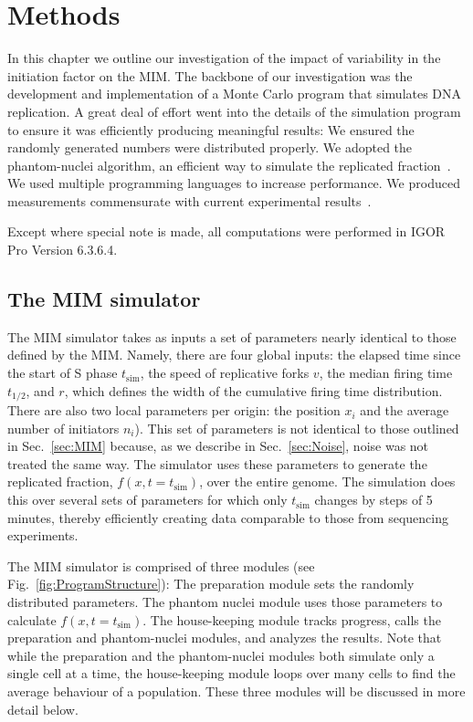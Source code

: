 \chapter{Methods}
\label{ch:Methods}

In this chapter we outline our investigation of the impact of variability in the initiation factor on the MIM.
The backbone of our investigation was the development and implementation of a Monte Carlo program that simulates DNA replication.
A great deal of effort went into the details of the simulation program to ensure it was efficiently producing meaningful results:
We ensured the randomly generated numbers were distributed properly.
We adopted the phantom-nuclei algorithm, an efficient way to simulate the replicated fraction~\cite{KJMA1}.
We used multiple programming languages to increase performance.
We produced measurements commensurate with current experimental results~\cite{StochasticTermination}.

Except where special note is made, all computations were performed in IGOR Pro Version 6.3.6.4.


	\section{The MIM simulator}
	\label{sec:MIMSimulator}
	
	The MIM simulator takes as inputs a set of parameters nearly identical to those defined by the MIM.
	Namely, there are four global inputs: the elapsed time since the start of S phase $t_\text{sim}$, the speed of replicative forks $v$, the median firing time $t_{1/2}$, and $r$, which defines the width of the cumulative firing time distribution.
	There are also two local parameters per origin: the position $x_i$ and the average number of initiators $n_i$).
	This set of parameters is not identical to those outlined in Sec.~\ref{sec:MIM} because, as we describe in Sec.~\ref{sec:Noise}, noise was not treated the same way.
	The simulator uses these parameters to generate the replicated fraction, $f(x,t=t_\text{sim})$, over the entire genome.
	The simulation does this over several sets of parameters for which only $t_\text{sim}$ changes by steps of 5 minutes, thereby efficiently creating data comparable to those from sequencing experiments.
	
	The MIM simulator is comprised of three modules (see Fig.~\ref{fig:ProgramStructure}):
	The preparation module sets the randomly distributed parameters.
	The phantom nuclei module uses those parameters to calculate $f(x,t=t_\text{sim})$.
	The house-keeping module tracks progress, calls the preparation and phantom-nuclei modules, and analyzes the results.
	Note that while the preparation and the phantom-nuclei modules both simulate only a single cell at a time, the house-keeping module loops over many cells to find the average behaviour of a population.
	These three modules will be discussed in more detail below.
		
